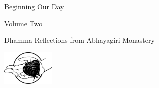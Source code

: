 \documentclass[11pt,openany]{memoir}
\begin{document}
\frontmatter
{}
\pagestyle{empty}

\begin{center}
\vspace*{100pt}
{ \huge Beginning Our Day }

\vspace{20pt}
{ \Large Volume Two}

\vspace{40pt}

{\large
Dhamma Reflections from Abhayagiri Monastery
}

\vfill{}

\includegraphics[width=1in]{abm_logo.eps}

\end{center}
\clearpage





\clearpage
\mbox{}\clearpage

\pagestyle{plain}
\tableofcontents*


\clearpage

\thispagestyle{empty}
\mbox{} \clearpage





\mainmatter





\clearpage


\end{document}

